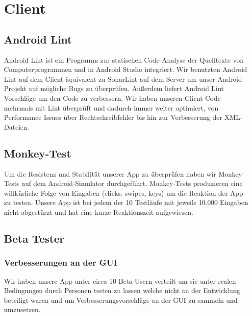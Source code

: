 \documentclass{scrartcl}
\begin{document}
\begin{center}
\end{center}
\newpage
\section{Client}
	\subsection{Android Lint}
	Android Lint ist ein Programm zur statischen Code-Analyse der Quelltexte von Computerprogrammen und in Android Studio integriert. Wir benutzten Android Lint auf dem Client äquivalent zu SonarLint auf dem Server um unser Android-Projekt auf mögliche Bugs zu überprüfen. Außerdem liefert Android Lint Vorschläge um den Code zu verbessern.
Wir haben unseren Client Code mehrmals mit Lint überprüft und dadurch immer weiter optimiert, von Performance Issues über Rechtschreibfehler bis hin zur Verbesserung der XML-Dateien.  


		\subsection{Monkey-Test}
Um die Resistenz und Stabilität unserer App zu überprüfen haben wir Monkey-Tests auf dem Android-Simulator durchgeführt.
Monkey-Tests produzieren eine willkürliche Folge von Eingaben (clicks, swipes, keys) um die Reaktion der App zu testen.
Unsere App ist bei jedem der 10 Testläufe mit jeweils 10.000 Eingaben nicht abgestürzt und hat eine kurze Reaktionszeit aufgewiesen.

		\subsection{Beta Tester}
		\subsubsection{Verbesserungen an der GUI}
Wir haben unsere App unter circa 10 Beta Usern verteilt um sie unter realen Bedingungen durch Personen testen zu lassen welche nicht an der Entwicklung beteiligt waren und um Verbesserungsvorschläge an der GUI zu sammeln und umzusetzen.
		
\end{document}
